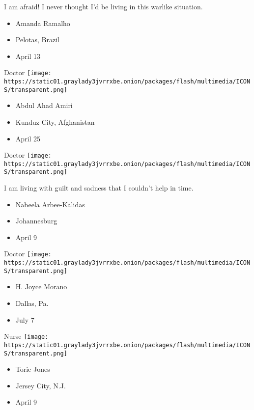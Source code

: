 I am afraid! I never thought I'd be living in this warlike situation.

\begin{itemize}
\tightlist
\item
  Amanda Ramalho
\item
  Pelotas, Brazil
\item
  April 13
\end{itemize}

\protect\hyperlink{item-abdul-ahad-amiri}{}

Doctor
\texttt{[image: https://static01.graylady3jvrrxbe.onion/packages/flash/multimedia/ICONS/transparent.png]}

\begin{itemize}
\tightlist
\item
  Abdul Ahad Amiri
\item
  Kunduz City, Afghanistan
\item
  April 25
\end{itemize}

\protect\hyperlink{item-nabeela-arbee-kalidas}{}

Doctor
\texttt{[image: https://static01.graylady3jvrrxbe.onion/packages/flash/multimedia/ICONS/transparent.png]}

I am living with guilt and sadness that I couldn't help in time.

\begin{itemize}
\tightlist
\item
  Nabeela Arbee-Kalidas
\item
  Johannesburg
\item
  April 9
\end{itemize}

\protect\hyperlink{item-h-joyce-morano}{}

Doctor
\texttt{[image: https://static01.graylady3jvrrxbe.onion/packages/flash/multimedia/ICONS/transparent.png]}

\begin{itemize}
\tightlist
\item
  H. Joyce Morano
\item
  Dallas, Pa.
\item
  July 7
\end{itemize}

\protect\hyperlink{item-torie-jones}{}

Nurse
\texttt{[image: https://static01.graylady3jvrrxbe.onion/packages/flash/multimedia/ICONS/transparent.png]}

\begin{itemize}
\tightlist
\item
  Torie Jones
\item
  Jersey City, N.J.
\item
  April 9
\end{itemize}

